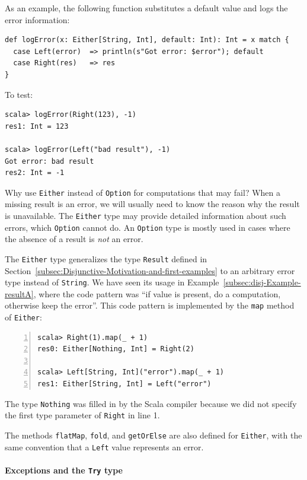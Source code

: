As an example, the following function substitutes a default value
and logs the error information:
\begin{lstlisting}
def logError(x: Either[String, Int], default: Int): Int = x match {
  case Left(error)  => println(s"Got error: $error"); default
  case Right(res)   => res
}
\end{lstlisting}
To test:
\begin{lstlisting}
scala> logError(Right(123), -1)
res1: Int = 123

scala> logError(Left("bad result"), -1)
Got error: bad result
res2: Int = -1
\end{lstlisting}

Why use \lstinline!Either! instead of \lstinline!Option! for computations
that may fail? When a missing result is an error, we will usually
need to know the reason why the result is unavailable. The \lstinline!Either!
type may provide detailed information about such errors, which \lstinline!Option!
cannot do. An \lstinline!Option! type is mostly used in cases where
the absence of a result is \emph{not} an error.

The \lstinline!Either! type generalizes the type \lstinline!Result!
defined in Section~\ref{subsec:Disjunctive-Motivation-and-first-examples}
to an arbitrary error type instead of \lstinline!String!. We have
seen its usage in Example~\ref{subsec:disj-Example-resultA}, where
the code pattern was \textsf{``}if value is present, do a computation, otherwise
keep the error\textsf{''}. This code pattern is implemented by the \lstinline!map!
method of \lstinline!Either!:
\begin{lstlisting}[numbers=left]
scala> Right(1).map(_ + 1)
res0: Either[Nothing, Int] = Right(2)

scala> Left[String, Int]("error").map(_ + 1)
res1: Either[String, Int] = Left("error")
\end{lstlisting}
The type \lstinline!Nothing! was filled in by the Scala compiler
because we did not specify the first type parameter of \lstinline!Right!
in line 1.

The methods \lstinline!flatMap!, \lstinline!fold!, and \lstinline!getOrElse!
are also defined for \lstinline!Either!, with the same convention
that a \lstinline!Left! value represents an error.

\paragraph{Exceptions and the \texttt{Try} type}

